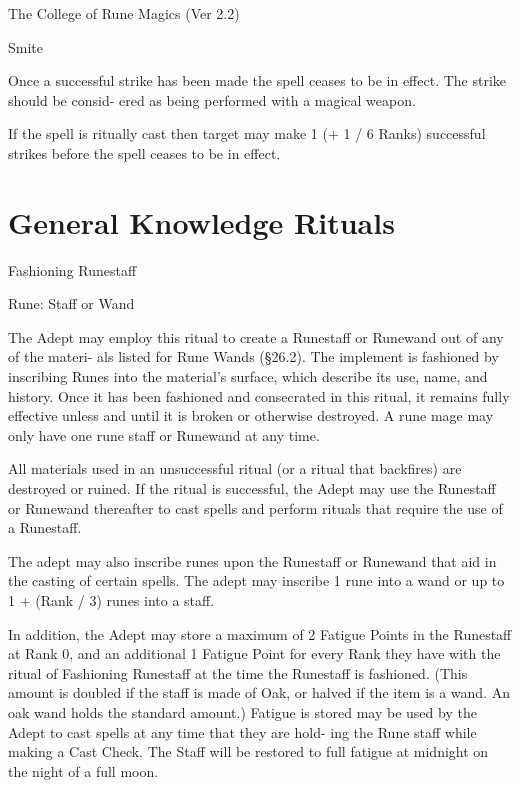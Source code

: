 \begin{Chapter}{The College of Rune Magics (Ver 2.2)}
\begin{spell}[G-7]{Smite }
\begin{effects}
Once  a  successful  strike  has  been  made  the  spell 
ceases to be in effect. The strike should be consid-
ered as being performed with a magical weapon. 

If  the  spell  is  ritually  cast  then target  may  make 1 
(+  1  /  6  Ranks)  successful  strikes  before  the  spell 
ceases to be in effect. 


\end{effects}
\end{spell}

\section{General Knowledge Rituals}

\begin{ritual}[Q-1]{Fashioning Runestaff }

Rune: Staff or Wand 
\begin{effects}
The Adept may employ this ritual to create 
a Runestaff or Runewand out of any of the materi-
als listed for Rune Wands  (§26.2). The implement 
is fashioned by inscribing Runes into the material’s 
surface, which describe its use, name, and history. 
Once it has been fashioned and consecrated in this 
ritual,  it  remains  fully  effective  unless  and  until  it 
is  broken  or  otherwise  destroyed.  A  rune  mage 
may only have one rune staff or Runewand at  any 
time. 

All  materials  used  in  an  unsuccessful  ritual  (or  a 
ritual that backfires) are destroyed or ruined. If the 
ritual  is  successful,  the  Adept  may  use  the 
Runestaff or Runewand thereafter to cast spells and 
perform rituals that require the use of a Runestaff. 

The  adept  may  also  inscribe  runes  upon  the 
Runestaff  or  Runewand  that  aid  in  the  casting  of 
certain spells. The adept may inscribe 1 rune into a 
wand or up to 1 + (Rank / 3) runes into a staff. 

In  addition,  the  Adept  may  store  a  maximum of  2 
Fatigue  Points  in  the  Runestaff  at  Rank  0,  and  an 
additional  1  Fatigue  Point  for  every  Rank  they 
have with the ritual of Fashioning Runestaff at the 
time  the  Runestaff  is  fashioned.  (This  amount  is 
doubled if the staff is made of Oak, or halved if the 
item  is  a  wand.  An  oak  wand  holds  the  standard 
amount.)  Fatigue  is  stored  may  be  used  by  the 
Adept to cast spells at any time that they are hold-
ing the Rune staff while making a Cast Check. The 
Staff will be restored to full fatigue at midnight on 
the night of a full moon. 


\end{effects}
\end{ritual}
\end{Chapter}
